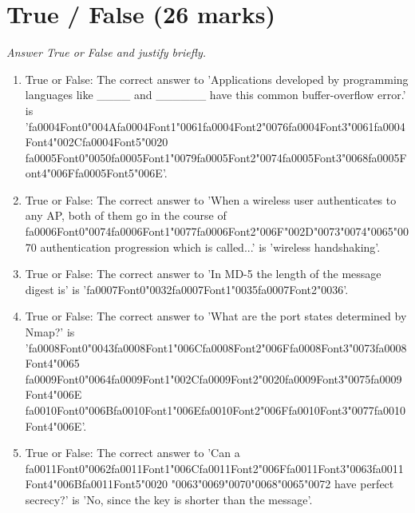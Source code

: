 \documentclass[12pt]{article}
\begin{document}
\section*{True / False (26 marks)}
\textit{Answer True or False and justify briefly.}
\begin{enumerate}[label=\arabic*.]
\item True or False: The correct answer to 'Applications developed by programming languages like \_\_\_\_ and \_\_\_\_\_\_ have this common buffer-overflow error.' is '{\csname fa0004Font0\endcsname\char"004A}{\csname fa0004Font1\endcsname\char"0061}{\csname fa0004Font2\endcsname\char"0076}{\csname fa0004Font3\endcsname\char"0061}{\csname fa0004Font4\endcsname\char"002C}{\csname fa0004Font5\endcsname\char"0020} {\csname fa0005Font0\endcsname\char"0050}{\csname fa0005Font1\endcsname\char"0079}{\csname fa0005Font2\endcsname\char"0074}{\csname fa0005Font3\endcsname\char"0068}{\csname fa0005Font4\endcsname\char"006F}{\csname fa0005Font5\endcsname\char"006E}'.
\item True or False: The correct answer to 'When a wireless user authenticates to any AP, both of them go in the course of {\csname fa0006Font0\endcsname\char"0074}{\csname fa0006Font1\endcsname\char"0077}{\csname fa0006Font2\endcsname\char"006F}{\char"002D}{\char"0073}{\char"0074}{\char"0065}{\char"0070} authentication progression which is called...' is 'wireless handshaking'.
\item True or False: The correct answer to 'In MD-5 the length of the message digest is' is '{\csname fa0007Font0\endcsname\char"0032}{\csname fa0007Font1\endcsname\char"0035}{\csname fa0007Font2\endcsname\char"0036}'.
\item True or False: The correct answer to 'What are the port states determined by Nmap?' is '{\csname fa0008Font0\endcsname\char"0043}{\csname fa0008Font1\endcsname\char"006C}{\csname fa0008Font2\endcsname\char"006F}{\csname fa0008Font3\endcsname\char"0073}{\csname fa0008Font4\endcsname\char"0065} {\csname fa0009Font0\endcsname\char"0064}{\csname fa0009Font1\endcsname\char"002C}{\csname fa0009Font2\endcsname\char"0020}{\csname fa0009Font3\endcsname\char"0075}{\csname fa0009Font4\endcsname\char"006E} {\csname fa0010Font0\endcsname\char"006B}{\csname fa0010Font1\endcsname\char"006E}{\csname fa0010Font2\endcsname\char"006F}{\csname fa0010Font3\endcsname\char"0077}{\csname fa0010Font4\endcsname\char"006E}'.
\item True or False: The correct answer to 'Can a {\csname fa0011Font0\endcsname\char"0062}{\csname fa0011Font1\endcsname\char"006C}{\csname fa0011Font2\endcsname\char"006F}{\csname fa0011Font3\endcsname\char"0063}{\csname fa0011Font4\endcsname\char"006B}{\csname fa0011Font5\endcsname\char"0020} {\char"0063}{\char"0069}{\char"0070}{\char"0068}{\char"0065}{\char"0072} have perfect secrecy?' is 'No, since the key is shorter than the message'.

\end{enumerate}
\end{document}

